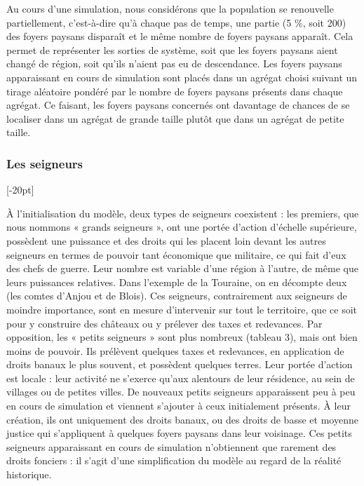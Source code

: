 Au cours d'une simulation, nous considérons que la population se renouvelle partiellement, c'est-à-dire qu'à chaque pas de temps, une partie (5 \%, soit 200) des foyers paysans disparaît et le même nombre de foyers paysans apparaît.
Cela permet de représenter les sorties de système, soit que les foyers paysans aient changé de région, soit qu'ils n'aient pas eu de descendance. 
Les foyers paysans apparaissant en cours de simulation sont placés dans un agrégat choisi suivant un tirage aléatoire pondéré par le nombre de foyers paysans présents dans chaque agrégat.
Ce faisant, les foyers paysans concernés ont davantage de chances de se localiser dans un agrégat de grande taille plutôt que dans un agrégat de petite taille.

\subsubsection{Les seigneurs}[-20pt]

À l'initialisation du modèle, deux types de seigneurs coexistent : les premiers, que nous nommons « grands seigneurs », ont une portée d'action d'échelle supérieure, possèdent une puissance et des droits qui les placent loin devant les autres seigneurs en termes de pouvoir tant économique que militaire, ce qui fait d'eux des chefs de guerre.
Leur nombre est variable d'une région à l'autre, de même que leurs puissances relatives.
Dans l'exemple de la Touraine, on en décompte deux (les comtes d'Anjou et de Blois).
Ces seigneurs, contrairement aux seigneurs de moindre importance, sont en mesure d'intervenir sur tout le territoire, que ce soit pour y construire des châteaux ou y prélever des taxes et redevances.
Par opposition, les « petits seigneurs » sont plus nombreux (tableau 3), mais ont bien moins de pouvoir.
Ils prélèvent quelques taxes et redevances, en application de droits banaux le plus souvent, et possèdent quelques terres.
Leur portée d'action est locale : leur activité ne s'exerce qu'aux alentours de leur résidence, au sein de villages ou de petites villes.
De nouveaux petits seigneurs apparaissent peu à peu en cours de simulation et viennent s'ajouter à ceux initialement présents.
À leur création, ils ont uniquement des droits banaux, ou des droits de basse et moyenne justice qui s'appliquent à quelques foyers paysans dans leur voisinage.
Ces petits seigneurs apparaissant en cours de simulation n'obtiennent que rarement des droits fonciers : il s'agit d'une simplification du modèle au regard de la réalité historique.


